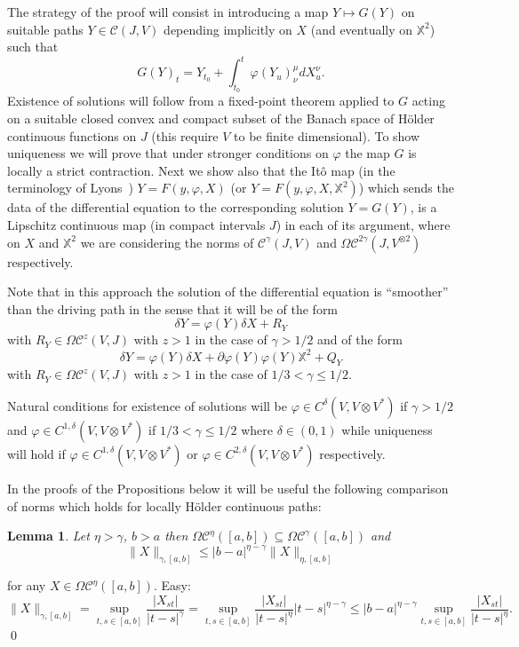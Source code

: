 \documentclass[a4paper,12pt,reqno]{amsproc}
\newcommand{\der}{\delta\!}
\newcommand{\CC}{\mathcal{C}}
\newcommand{\OCC}{\Omega \mathcal{C}}
\newcommand{\norm}[1]{\lVert #1\rVert}
\newcommand{\abs}[1]{\lvert #1\rvert}
\newtheorem{lemma}{Lemma}
\begin{document}
The strategy of the proof will consist in introducing a map $Y \mapsto
G(Y)$ on suitable  paths $Y \in \CC(J,V)$
depending implicitly on $X$ (and eventually on $\mathbb{X}^2$) such that
\begin{equation}
  \label{eq:mapG}
  G(Y)_t = Y_{t_0} + \int_{t_0}^t \varphi(Y_u)^\mu_\nu dX^\nu_u. 
\end{equation}
Existence of solutions will follow from a fixed-point theorem applied
to $G$ acting on a suitable closed convex and compact   subset of the Banach
space of H\"older continuous functions on $J$
(this require $V$ to be finite dimensional). 
To show uniqueness we will prove that under stronger conditions on
$\varphi$ the map $G$ is locally a strict contraction. 
Next we show also that the It\^o map (in the terminology of
Lyons~\cite{Lyons})  $Y=F(y,\varphi,X) $ (or
$Y=F(y,\varphi,X,\mathbb{X}^2)$) which sends the data of the
differential equation to the corresponding  solution  $Y = G(Y)$, is a
Lipschitz continuous map (in compact intervals $J$) in each of its argument, where
on $X$ and $\mathbb{X}^2$ we are considering the norms of
$\CC^\gamma(J,V)$ and $\OCC^{2\gamma}(J,V^{\otimes 2})$ respectively.


Note that in this approach the solution of the differential equation
is ``smoother'' than the driving path in the sense that it will be of
the form
$$
\der Y = \varphi(Y) \der X + R_Y
$$
with $R_Y \in \OCC^{z}(V,J)$ with $z>1$ in the case of $\gamma > 1/2$
and of the form
$$
\der Y = \varphi(Y) \der X + \partial \varphi(Y) \varphi(Y) \mathbb{X}^2 + Q_Y
$$
with $R_Y \in \OCC^{z}(V,J)$ with $z>1$ in the case of $1/3 < \gamma
\le 1/2$. 

Natural conditions for existence of solutions will be $\varphi \in
C^{\delta}(V,V\otimes V^*)$ if $\gamma > 1/2$ and $\varphi \in
C^{1,\delta}(V,V\otimes V^*)$ if $1/3 < \gamma \le 1/2$ where $\delta \in
(0,1)$ while uniqueness will
hold if $\varphi \in C^{1,\delta}(V,V\otimes V^*)$ or $\varphi \in
C^{2,\delta}(V,V\otimes V^*)$ 
respectively.


In the proofs of the Propositions below it will be useful the following
comparison of norms which holds for locally H\"older continuous paths:
\begin{lemma}
\label{lemma:improved_bound}
 Let $\eta > \gamma$, $b>a$ then $\OCC^\eta([a,b]) \subseteq
 \OCC^\gamma([a,b])$ and 
 \begin{equation*}
    \norm{X}_{\gamma,[a,b]} \le |b-a|^{\eta-\gamma} \norm{X}_{\eta,[a,b]}
 \end{equation*}
\end{lemma}
for any $X \in \OCC^\eta([a,b])$.
\proof
Easy:
\begin{equation*}
  \norm{X}_{\gamma,[a,b]}  = \sup_{t,s \in [a,b]}
  \frac{\abs{X_{st}}}{|t-s|^\gamma} = \sup_{t,s \in [a,b]}
  \frac{\abs{X_{st}}}{|t-s|^\eta} |t-s|^{\eta-\gamma} \le
  |b-a|^{\eta-\gamma}  \sup_{t,s \in [a,b]}
  \frac{\abs{X_{st}}}{|t-s|^\eta}.
\end{equation*}
\qed
\end{document}
